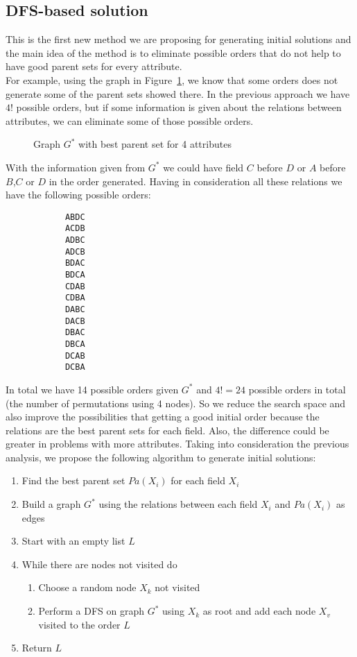 \subsection{DFS-based solution}
\label{subsec:dfsapproach}
	This is the first new method we are proposing for generating initial solutions and the main idea of the method is to eliminate possible orders that do not help to have good parent sets for every attribute.\\
	For example, using the graph in Figure~\ref{fig:example}, we know that some orders does not generate some of the parent sets showed there. In the previous approach we have $4!$ possible orders, but if some information is given about the relations between attributes, we can eliminate some of those possible orders.
	\begin{figure}[H]
		\centering
		
		\caption{Graph $G^*$ with best parent set for 4 attributes}
		\label{fig:example}
	\end{figure}
	With the information given from $G^*$ we could have field $C$ before $D$ or $A$ before $B$,$C$ or $D$ in the order generated. Having in consideration all these relations we have the following possible orders:
	\begin{multicols}{7}
		\begin{verbatim}
			ABDC
			ACDB
			ADBC
			ADCB
			BDAC
			BDCA
			CDAB
			CDBA
			DABC
			DACB
			DBAC
			DBCA
			DCAB
			DCBA
		\end{verbatim}
	\end{multicols}
	In total we have 14 possible orders given $G^*$ and $4! = 24$ possible orders in total (the number of permutations using 4 nodes). So we reduce the search space and also improve the possibilities that getting a good initial order because the relations are the best parent sets for each field. Also, the difference could be greater in problems with more attributes.
	Taking into consideration the previous analysis, we propose the following algorithm to generate initial solutions:
	\begin{enumerate}
		\item Find the best parent set ${Pa}( X_i )$ for each field $X_i$
		\item Build a graph $G^*$ using the relations between each field $X_i$ and ${Pa}( X_i )$ as edges
		\item Start with an empty list $L$
		\item While there are nodes not visited do
		\begin{enumerate}
			\item Choose a random node $X_k$ not visited
			\item Perform a DFS on graph $G^*$ using $X_k$ as root and add each node $X_v$ visited to the order $L$
		\end{enumerate}
		\item Return $L$
	\end{enumerate}
	
